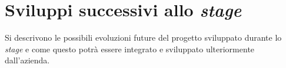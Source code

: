 \section{Sviluppi successivi allo \textit{stage}}
Si descrivono le possibili evoluzioni future del progetto sviluppato durante lo \textit{stage} e come questo potrà essere integrato e sviluppato ulteriormente dall'azienda.